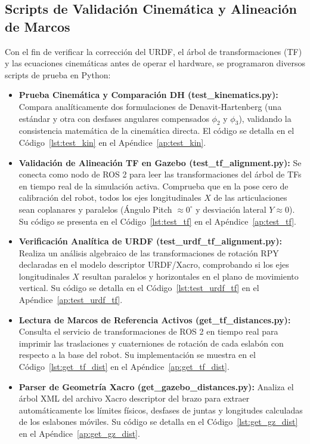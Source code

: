 \documentclass[conference,a4paper]{IEEEtran}
\begin{document}
\subsection{Scripts de Validación Cinemática y Alineación de Marcos}
Con el fin de verificar la corrección del URDF, el árbol de transformaciones (TF) y las ecuaciones cinemáticas antes de operar el hardware, se programaron diversos scripts de prueba en Python:
\begin{itemize}
    \item \textbf{Prueba Cinemática y Comparación DH (test\_kinematics.py):} Compara analíticamente dos formulaciones de Denavit-Hartenberg (una estándar y otra con desfases angulares compensados $\phi_2$ y $\phi_3$), validando la consistencia matemática de la cinemática directa. El código se detalla en el Código~\ref{lst:test_kin} en el Apéndice~\ref{ap:test_kin}.
    \item \textbf{Validación de Alineación TF en Gazebo (test\_tf\_alignment.py):} Se conecta como nodo de ROS 2 para leer las transformaciones del árbol de TFs en tiempo real de la simulación activa. Comprueba que en la pose cero de calibración del robot, todos los ejes longitudinales $X$ de las articulaciones sean coplanares y paralelos (Ángulo Pitch $\approx 0^\circ$ y desviación lateral $Y \approx 0$). Su código se presenta en el Código~\ref{lst:test_tf} en el Apéndice~\ref{ap:test_tf}.
    \item \textbf{Verificación Analítica de URDF (test\_urdf\_tf\_alignment.py):} Realiza un análisis algebraico de las transformaciones de rotación RPY declaradas en el modelo descriptor URDF/Xacro, comprobando si los ejes longitudinales $X$ resultan paralelos y horizontales en el plano de movimiento vertical. Su código se detalla en el Código~\ref{lst:test_urdf_tf} en el Apéndice~\ref{ap:test_urdf_tf}.
    \item \textbf{Lectura de Marcos de Referencia Activos (get\_tf\_distances.py):} Consulta el servicio de transformaciones de ROS 2 en tiempo real para imprimir las traslaciones y cuaterniones de rotación de cada eslabón con respecto a la base del robot. Su implementación se muestra en el Código~\ref{lst:get_tf_dist} en el Apéndice~\ref{ap:get_tf_dist}.
    \item \textbf{Parser de Geometría Xacro (get\_gazebo\_distances.py):} Analiza el árbol XML del archivo Xacro descriptor del brazo para extraer automáticamente los límites físicos, desfases de juntas y longitudes calculadas de los eslabones móviles. Su código se detalla en el Código~\ref{lst:get_gz_dist} en el Apéndice~\ref{ap:get_gz_dist}.
\end{itemize}
\end{document}
